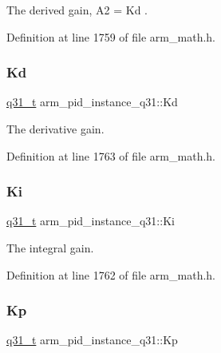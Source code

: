 The derived gain, A2 = Kd . 

Definition at line 1759 of file arm\+\_\+math.\+h.

\mbox{\label{structarm__pid__instance__q31_aab4ff371d14441df501f1169f71cbd17}} 
\subsubsection{\texorpdfstring{Kd}{Kd}}
{\footnotesize\ttfamily \hyperlink{arm__math_8h_adc89a3547f5324b7b3b95adec3806bc0}{q31\+\_\+t} arm\+\_\+pid\+\_\+instance\+\_\+q31\+::\+Kd}

The derivative gain. 

Definition at line 1763 of file arm\+\_\+math.\+h.

\mbox{\label{structarm__pid__instance__q31_aa861d69fd398f29aa0b4b455a823ed72}} 
\subsubsection{\texorpdfstring{Ki}{Ki}}
{\footnotesize\ttfamily \hyperlink{arm__math_8h_adc89a3547f5324b7b3b95adec3806bc0}{q31\+\_\+t} arm\+\_\+pid\+\_\+instance\+\_\+q31\+::\+Ki}

The integral gain. 

Definition at line 1762 of file arm\+\_\+math.\+h.

\mbox{\label{structarm__pid__instance__q31_ac2410bf7f856d58dc1d773d4983cac8e}} 
\subsubsection{\texorpdfstring{Kp}{Kp}}
{\footnotesize\ttfamily \hyperlink{arm__math_8h_adc89a3547f5324b7b3b95adec3806bc0}{q31\+\_\+t} arm\+\_\+pid\+\_\+instance\+\_\+q31\+::\+Kp}


